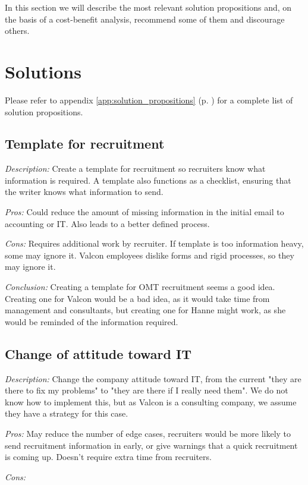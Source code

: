In this section we will describe the most relevant solution propositions and, on the basis of a cost-benefit analysis, recommend some of them and discourage others.

\section{Solutions}
Please refer to appendix \ref{app:solution_propositions} (p. \pageref{app:solution_propositions}) for a complete list of solution propositions.

\subsection{Template for recruitment}
\emph{Description:} Create a template for recruitment so recruiters know what information is required. A template also functions as a checklist, ensuring that the writer knows what information to send.

\emph{Pros:} Could reduce the amount of missing information in the initial email to accounting or IT. 
Also leads to a better defined process.

\emph{Cons:} Requires additional work by recruiter. 
If template is too information heavy, some may ignore it.
Valcon employees dislike forms and rigid processes, so they may ignore it.

\emph{Conclusion:} Creating a template for OMT recruitment seems a good idea.
Creating one for Valcon would be a bad idea, as it would take time from management and consultants, but creating one for Hanne might work, as she would be reminded of the information required.

\subsection{Change of attitude toward IT}
\emph{Description:} Change the company attitude toward IT, from the current "they are there to fix my problems" to "they are there if I really need them".
We do not know how to implement this, but as Valcon is a consulting company, we assume they have a strategy for this case.

\emph{Pros:} May reduce the number of edge cases, recruiters would be more likely to send recruitment information in early, or give warnings that a quick recruitment is coming up.
Doesn't require extra time from recruiters.

\emph{Cons:} 

